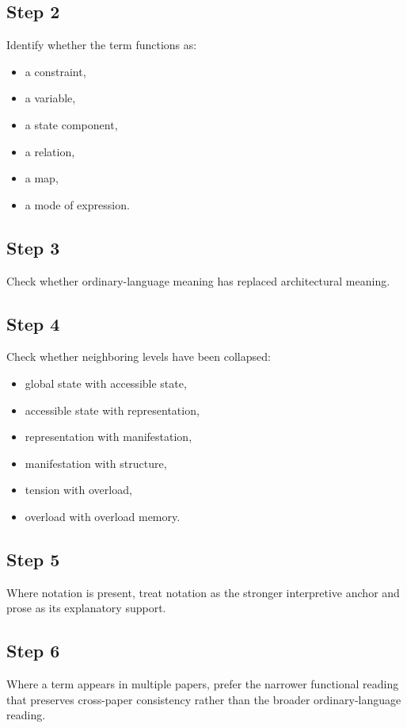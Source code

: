\documentclass[11pt,a4paper]{article}
\begin{document}
	\subsection*{Step 2}
	Identify whether the term functions as:
	\begin{itemize}[leftmargin=2em]
		\item a constraint,
		\item a variable,
		\item a state component,
		\item a relation,
		\item a map,
		\item a mode of expression.
	\end{itemize}
	
	\subsection*{Step 3}
	Check whether ordinary-language meaning has replaced architectural meaning.
	
	\subsection*{Step 4}
	Check whether neighboring levels have been collapsed:
	\begin{itemize}[leftmargin=2em]
		\item global state with accessible state,
		\item accessible state with representation,
		\item representation with manifestation,
		\item manifestation with structure,
		\item tension with overload,
		\item overload with overload memory.
	\end{itemize}
	
	\subsection*{Step 5}
	Where notation is present, treat notation as the stronger interpretive anchor and prose as its explanatory support.
	
	\subsection*{Step 6}
	Where a term appears in multiple papers, prefer the narrower functional reading that preserves cross-paper consistency rather than the broader ordinary-language reading.
	
\end{document}
